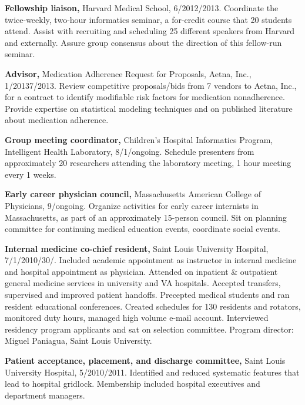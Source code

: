 \documentclass[12pt]{article}
\begin{document}
\textbf{Fellowship liaison,} Harvard Medical School,
6/2012/2013. Coordinate the twice-week\-ly, two-hour
informatics seminar, a for-credit course that 20 students attend.
Assist with recruiting and scheduling 25 different speakers from
Harvard and externally. Assure group consensus about the direction of
this fellow-run seminar.

\textbf{Advisor,} Medication Adherence Request for Proposals, Aetna, Inc.,
1/2013\ndash{}7/2013. Review competitive proposals/bids from 7 vendors to
Aetna, Inc., for a contract to identify modifiable risk factors for
medication nonadherence. Provide expertise on statistical modeling
techniques and on published literature about medication adherence.

\textbf{Group meeting coordinator,} Children’s Hospital Informatics
Program, Intel\-li\-gent Health Lab\-o\-ra\-to\-ry,
8/1/\ndash{}\linebreak[0]ongoing. Schedule presenters
from approximately 20 researchers attending the laboratory meeting, 1
hour meeting every 1 weeks.

\textbf{Early career physician council,} Massachusetts American
College of Physicians,
9/\ndash{}\linebreak[0]on\-go\-ing. Organize activities
for early career internists in Massachusetts, as part of an
approximately 15-person council. Sit on planning committee for
continuing medical education events, coordinate social events.

\textbf{Internal medicine co-chief resident,} Saint Louis University
Hospital, 7/1/2010\ndash{}/30/. Included academic
appointment as instructor in internal medicine and hospital
appointment as physician. Attended on inpatient \& outpatient general
medicine services in university and VA hospitals. Accepted transfers,
supervised and improved patient handoffs. Precepted medical students
and ran resident educational conferences. Created schedules for 130
residents and rotators, monitored duty hours, managed high volume
e-mail account. Interviewed residency program applicants and sat on
selection committee. Program director: Miguel Paniagua, Saint Louis
University.

\textbf{Patient acceptance, placement, and discharge committee,} Saint
Louis University Hospital, 5/2010\ndash{}/2011. Identified
and reduced systematic features that lead to hospital gridlock.
Membership included hospital executives and department managers.
\end{document}
